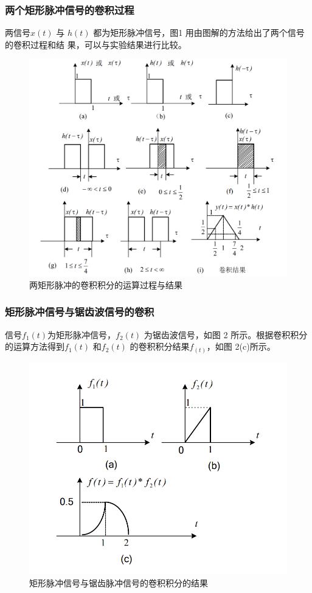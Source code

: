 \documentclass[UTF8,AutoFakeBold]{ctexart}
\begin{document}
	\subsubsection{\heiti{}两个矩形脉冲信号的卷积过程}
		两信号$x(t)$ 与 $h(t)$ 都为矩形脉冲信号，图1 用由图解的方法给出了两个信号的卷积过程和结
	果，可以与实验结果进行比较。
		\begin{figure}[ht]
			\centering
			\includegraphics[scale=0.4]{./figures/photo1.png}
			\caption{两矩形脉冲的卷积积分的运算过程与结果}
		\end{figure}

	\subsubsection{\heiti{}矩形脉冲信号与锯齿波信号的卷积}
	信号$f_1(t)$为矩形脉冲信号，$f_2(t)$ 为锯齿波信号，如图 2 所示。根据卷积积分的运算方法得到$f_1(t)$ 和$f_2(t)$ 的卷积积分结果$f_(t)$，如图 2(c)所示。
		\begin{figure}[ht]
			\centering
			\includegraphics[scale=0.5]{./figures/photo2.png}
			\caption{矩形脉冲信号与锯齿脉冲信号的卷积积分的结果}
		\end{figure}
\end{document}
